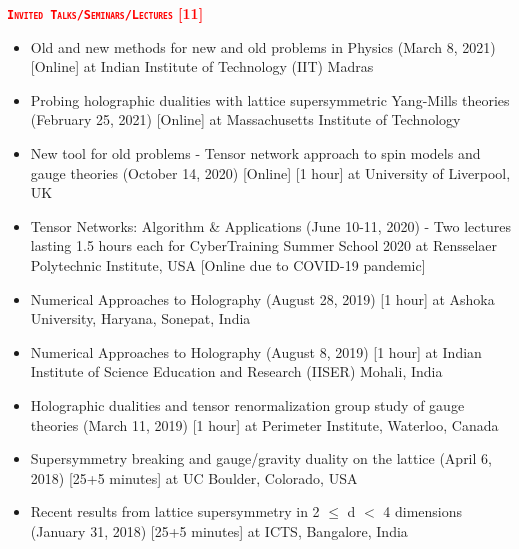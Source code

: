 \renewcommand\ttdefault{cmvtt}
\textcolor{red}{\textbf{\textsc{\fontsize{11}{48} \bfseries \texttt{Invited Talks/Seminars/Lectures} [11]}}}

\begin{itemize}
 \item Old and new methods for new and old problems in Physics
 (March 8, 2021) [Online] at Indian Institute of Technology (IIT) Madras
 \href{https://rgjha.github.io/talks/Collo_IITM.pdf}{{\texttt{}}} 
 \item Probing holographic dualities with lattice supersymmetric Yang-Mills theories 
 (February 25, 2021) [Online] at Massachusetts Institute of Technology
 \href{https://rgjha.github.io/talks/MIT_v2.pdf}{{\texttt{}}} 
 \href{http://y2u.be/fO8A18uwYIM}{{\texttt{}}}
 \item New tool for old problems - Tensor network approach to spin models and gauge theories 
 (October 14, 2020) [Online] [1 hour] at University of Liverpool, UK
 \href{https://rgjha.github.io/talks/Seminar_v2.pdf}{{\texttt{}}} 
 \item Tensor Networks: Algorithm \& Applications (June 10-11, 2020) - Two lectures lasting 1.5 hours each for 
 CyberTraining Summer School 2020 at Rensselaer Polytechnic Institute, USA [Online due to COVID-19 pandemic] 
 \href{https://rgjha.github.io/talks/cs2020.pdf}{{\texttt{\COL{[Lecture 1 \& 2]}}}} 
 \item Numerical Approaches to Holography (August 28, 2019) [1 hour] at Ashoka University, Haryana, Sonepat, India
 \href{https://rgjha.github.io/talks/Talk_v1.pdf}{{\texttt{}}} 
 \item Numerical Approaches to Holography (August 8, 2019) [1 hour] at Indian Institute of Science Education and Research (IISER) Mohali, India
  \item Holographic dualities and tensor renormalization group study of gauge theories (March 11, 2019) [1 hour] at Perimeter Institute, Waterloo, Canada 
  \href{http://www.perimeterinstitute.ca/videos/interdisciplinary-seminar-holographic-dualities-and-tensor-renormalization-group-study-gauge}
{{\texttt{}}} 
  \item Supersymmetry breaking and gauge/gravity duality on the lattice (April 6, 2018) [25+5 minutes] at UC Boulder, Colorado, USA \href{https://rgjha.github.io/talks/lbsm18_jha.pdf}{{\texttt{}}} 
  \item Recent results from lattice supersymmetry in 2 $\le$ d $<$ 4 dimensions (January 31, 2018) [25+5 minutes] at ICTS, Bangalore, India \href{https://www.youtube.com/watch?v=Zey6DAEiw0c}{{\texttt{}}} 

\end{itemize}
